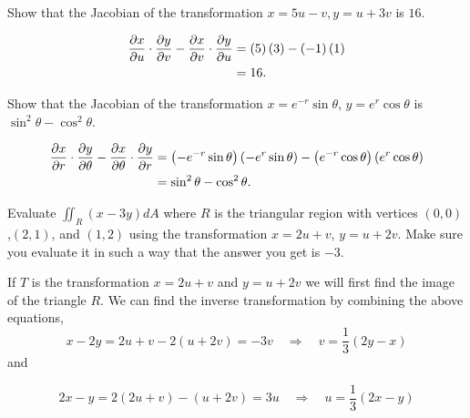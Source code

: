 \documentclass[12pt]{exam}
\begin{document}
\begin{questions}

\question Show that the Jacobian of the transformation \(x=5u-v,y=u+3v\) is \(16\).
\ifprintanswers
        \begin{solution}
            \begin{align*}
              \dfrac{\partial x}{\partial u}\cdot\dfrac{\partial y}{\partial v}-\dfrac{\partial x}{\partial v}\cdot\dfrac{\partial y}{\partial u} & = \left( 5 \right)  \left(3\right)-\left(-1\right)\left(1\right)\\
              &= 16.
            \end{align*}
        \end{solution}
    \else
        \vfill
    \fi

\question Show that the Jacobian of the transformation \(x=e^{-r}\sin\theta\), \(y=e^r\cos\theta\) is \(\sin^2\theta-\cos^2\theta\).
\ifprintanswers
        \begin{solution}
            \begin{align*}
                \dfrac{\partial x}{\partial r}\cdot\dfrac{\partial y}{\partial \theta}-\dfrac{\partial x}{\partial \theta}\cdot\dfrac{\partial y}{\partial r} & = \left(-e^{-r}\sin\theta\right)\left(-e^{r}\sin\theta\right)-\left(e^{-r}\cos\theta\right)\left(e^{r}\cos\theta\right)\\
                &= \sin^2\theta-\cos^2\theta.
            \end{align*}
        \end{solution}
    \else
        \vfill
    \fi

\newpage
\question Evaluate \(\iint_R(x-3y)dA\) where \(R\) is the triangular region with vertices \((0,0)\),\((2,1)\), and \((1,2)\) using the transformation \(x=2u+v\), \(y=u+2v\). Make sure you evaluate it in such a way that the answer you get is \(-3\).
\ifprintanswers
        \begin{solution}
            If \(T\) is the transformation \(x=2u+v\) and \(y=u+2v\) we will first find the image of the triangle \(R\). 
            We can find the inverse transformation by combining the above equations,
            \[
                x-2y=2u+v-2\left(u+2v\right) = -3v \quad\Rightarrow\quad v=\frac{1}{3}\left(2y-x\right)
            \]
            and

            \[
                2x-y = 2\left(2u+v\right)-(u+2v)=3u \quad\Rightarrow\quad u=\frac{1}{3}\left(2x-y\right)
            \]


\end{solution}
\end{questions}
\end{document}
